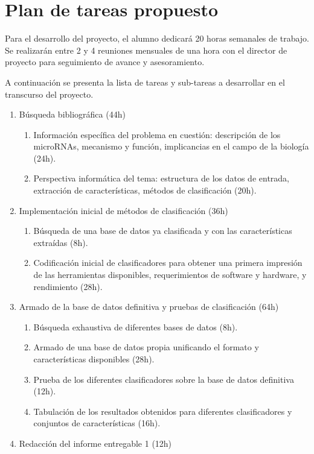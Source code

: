 \documentclass[bibliography=openstyle,DIV=12]{scrartcl}
\begin{document}
\section{Plan de tareas propuesto}
Para el desarrollo del proyecto, el alumno dedicará 20 horas semanales de trabajo. Se realizarán entre 2 y 4 reuniones mensuales de una hora con el director de proyecto para seguimiento de avance y asesoramiento.

A continuación se presenta la lista de tareas y sub-tareas a desarrollar en el transcurso del proyecto.
\begin{enumerate}
\item Búsqueda bibliográfica (44h)
  \begin{enumerate}
  \item Información específica del problema en cuestión: descripción de los microRNAs, mecanismo y función, implicancias en el campo de la biología (24h).
  \item Perspectiva informática del tema: estructura de los datos de entrada, extracción de características, métodos de clasificación (20h).
  \end{enumerate}
\item Implementación inicial de métodos de clasificación (36h)
  \begin{enumerate}
  \item Búsqueda de una base de datos ya clasificada y con las características extraídas (8h).
  \item Codificación inicial de clasificadores para obtener una primera impresión de las herramientas disponibles, requerimientos de software y hardware, y rendimiento (28h).
  \end{enumerate}
\item Armado de la base de datos definitiva y pruebas de clasificación (64h)
  \begin{enumerate}
  \item Búsqueda exhaustiva de diferentes bases de datos (8h).
  \item Armado de una base de datos propia unificando el formato y características disponibles (28h).
  \item Prueba de los diferentes clasificadores sobre la base de datos definitiva (12h).
  \item Tabulación de los resultados obtenidos para diferentes clasificadores y conjuntos de características (16h).
  \end{enumerate}
\item Redacción del informe entregable 1 (12h)

\end{enumerate}
\end{document}
